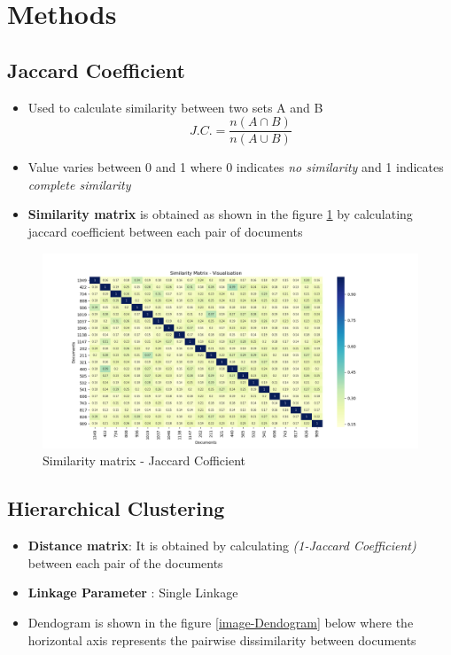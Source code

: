 \documentclass[7pt,a4paper]{article}
\begin{document}
\section{Methods}
\subsection{Jaccard Coefficient}
\begin{itemize}
\item{Used to calculate similarity between two sets A and B
$$ J.C. = \frac{n(A \cap B)}{n(A \cup B)} $$}
\item{Value varies between 0 and 1 where 0 indicates \textit{no similarity} and 1 indicates \textit{complete similarity}}
\item{\textbf{Similarity matrix} is obtained as shown in the figure \ref{image-J-C} by calculating jaccard coefficient between each pair of documents}
\end{itemize}
\begin{figure}[h]
\centering
\includegraphics[scale=.40]{Heatmap}
\caption{Similarity matrix - Jaccard Cofficient}
\label{image-J-C}
\end{figure}


\subsection{Hierarchical Clustering}
\begin{itemize}
\item{\textbf{Distance matrix}: It is obtained by calculating \textit{(1-Jaccard Coefficient)} between each pair of the documents}
\item{\textbf{Linkage Parameter} : Single Linkage}
\item{Dendogram is shown in the figure \ref{image-Dendogram} below where the horizontal axis represents the pairwise dissimilarity between documents}
\end{itemize}
\end{document}
